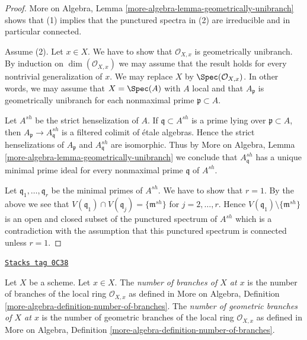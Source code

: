 \begin{proof}
More on Algebra, Lemma \ref{more-algebra-lemma-geometrically-unibranch}
shows that (1) implies that the punctured spectra in (2) are
irreducible and in particular connected.

\medskip\noindent
Assume (2). Let $x \in X$. We have to show that $\mathcal{O}_{X, x}$
is geometrically unibranch. By induction on $\dim(\mathcal{O}_{X, x})$
we may assume that the result holds for every nontrivial generalization of $x$.
We may replace $X$ by $\Spec(\mathcal{O}_{X, x})$. In other words,
we may assume that $X = \Spec(A)$ with $A$ local and that
$A_\mathfrak p$ is geometrically unibranch for each nonmaximal
prime $\mathfrak p \subset A$.

\medskip\noindent
Let $A^{sh}$ be the strict henselization of $A$. If
$\mathfrak q \subset A^{sh}$ is a prime lying over $\mathfrak p \subset A$,
then $A_\mathfrak p \to A^{sh}_\mathfrak q$ is a
filtered colimit of \'etale algebras. Hence the strict henselizations of
$A_\mathfrak p$ and $A^{sh}_\mathfrak q$ are isomorphic.
Thus by More on Algebra, Lemma \ref{more-algebra-lemma-geometrically-unibranch}
we conclude that $A^{sh}_\mathfrak q$
has a unique minimal prime ideal for every nonmaximal prime $\mathfrak q$ of
$A^{sh}$.

\medskip\noindent
Let $\mathfrak q_1, \ldots, \mathfrak q_r$ be the minimal primes
of $A^{sh}$. We have to show that $r = 1$. By the above
we see that $V(\mathfrak q_1) \cap V(\mathfrak q_j) = \{\mathfrak m^{sh}\}$
for $j = 2, \ldots, r$. Hence $V(\mathfrak q_1) \setminus \{\mathfrak m^{sh}\}$
is an open and closed subset of the punctured spectrum of $A^{sh}$
which is a contradiction with the assumption that this punctured spectrum
is connected unless $r = 1$.
\end{proof}

\begin{definition}
\label{properties-definition-number-of-branches}
\href{https://stacks.math.columbia.edu/tag/0C38}{\texttt{Stacks tag 0C38}}

Let $X$ be a scheme. Let $x \in X$. The {\it number of branches of $X$
at $x$} is the number of branches of the local ring $\mathcal{O}_{X, x}$
as defined in
More on Algebra, Definition \ref{more-algebra-definition-number-of-branches}.
The {\it number of geometric branches of $X$ at $x$} is the number of
geometric branches of the local ring $\mathcal{O}_{X, x}$ as defined in
More on Algebra, Definition \ref{more-algebra-definition-number-of-branches}.
\end{definition}


